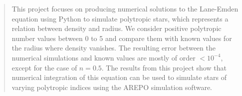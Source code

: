 \documentclass[linenumbers,trackchanges]{aastex701}
\newcommand\aastex{AAS\TeX}
\begin{document}
\begin{abstract}

This project focuses on producing numerical solutions to the Lane-Emden equation using Python to simulate polytropic stars, which represents a relation between density and radius. We consider positive polytropic number values between 0 to 5 and compare them with known values for the radius where density vanishes. The resulting error between the numerical simulations and known values are mostly of order $<10^{-4}$, except for the case of $n=0.5$. The results from this project show that numerical integration of this equation can be used to simulate stars of varying polytropic indices using the AREPO simulation software.

\end{abstract}

\end{document}
